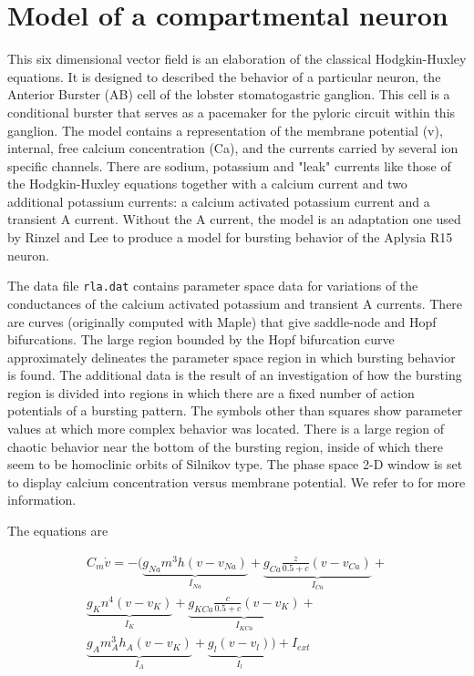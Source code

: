 \section{Model of a compartmental neuron}

This six dimensional vector field is an elaboration of the classical
Hodgkin-Huxley equations. It is designed to described the behavior
of a particular neuron, the Anterior Burster (AB) cell of the 
lobster stomatogastric ganglion. This cell is a conditional burster
that serves as a pacemaker for the pyloric circuit within this ganglion.
The model contains a representation of the membrane potential (v),
internal, free calcium concentration (Ca), and the currents carried
by several ion specific channels. There are sodium, potassium and
"leak" currents like those of the Hodgkin-Huxley equations  together
with a calcium current and two additional potassium currents: a
calcium activated potassium current and a transient A current. Without
the A current, the model is an adaptation one used by Rinzel and Lee
to produce a model for bursting behavior of the Aplysia R15 neuron.

The data file {\tt rla.dat} contains parameter space data for variations
of the conductances of the calcium activated potassium and transient A
currents. There are curves (originally computed with Maple) that give
saddle-node and Hopf bifurcations. The large region bounded by the 
Hopf bifurcation curve approximately delineates the parameter space
region in which bursting behavior is found. The additional data is the 
result of an investigation of how the bursting region is divided into
regions in which there are a fixed number of action  potentials of a
bursting pattern. The symbols other than squares show parameter values
at which more complex behavior was located. There is a large region of
chaotic behavior near the bottom of the bursting region, inside of which
there seem to be homoclinic orbits of Silnikov type. The phase space 2-D 
window is set to display calcium concentration versus membrane potential.
We refer to \cite{epsteinmarder,GGHW,rinzel1} for more information.

The equations are

\begin{eqnarray} 
C_{m}\dot{v} = -(
\underbrace{g_{Na}m^3h(v-v_{Na})}_{I_{Na}} + 
\underbrace{g_{Ca} \frac{z}{0.5+c} (v-v_{Ca})}_{I_{Ca}} + \nonumber \\
\underbrace{g_Kn^4(v-v_K)}_{I_{K}} + 
\underbrace{g_{KCa}\frac{c}{0.5+c}(v-v_{K})}_{I_{KCa}} + \nonumber \\
\underbrace{g_{A}m_A^3h_A(v-v_K)}_{I_{A}} + 
\underbrace{g_l(v-v_l)}_{I_{l}}) + I_{ext}        \label{vdot}
\end{eqnarray} 

